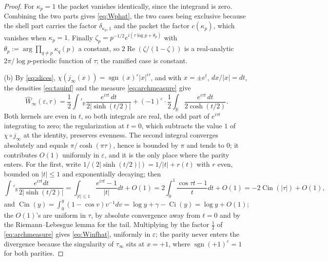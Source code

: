 \documentclass[11pt]{amsart}
\theoremstyle{definition}
\theoremstyle{remark}
\newcommand{\R}{\mathbb R}
\newcommand{\Rel}{\operatorname{Re}}
\newcommand{\sgn}{\operatorname{sgn}}
\newcommand{\Wh}{\widehat{W}}
\begin{document}
\begin{proof}
For $\kappa_p=1$ the packet vanishes identically, since the integrand is
zero.  Combining the two parts gives \eqref{eq:Wphat}, the two cases being exclusive because the shell
part carries the factor $\delta_{\kappa_p,1}$ and the packet the factor
$c(\kappa_p)$, which vanishes when $\kappa_p=1$.  Finally
$\zeta_p=p^{-1/2}e^{i(\tau\log p+\theta_p)}$ with
$\theta_p:=\arg\prod_{q\ne p}\kappa_q(p)$ a constant, so
$2\Rel(\zeta/(1-\zeta))$ is a real-analytic $2\pi/\log p$-periodic function of
$\tau$; the ramified case is constant.

(b)  By \eqref{eq:slices}, $\chi(j_{\infty}(x))=\sgn(x)^{\varepsilon}
|x|^{i\tau}$, and with $x=\pm e^{t}$, $dx/|x|=dt$, the densities
\eqref{eq:tauinf} and the measure \eqref{eq:archmeasure} give
\begin{equation}\label{eq:Winfhat2}
\Wh_{\infty}(\varepsilon,\tau)=\frac12\int'_{\R}
\frac{e^{i\tau t}\,dt}{2|\sinh(t/2)|}
+(-1)^{\varepsilon}\cdot\frac12\int_{\R}\frac{e^{i\tau t}\,dt}{2\cosh(t/2)} .
\end{equation}
Both kernels are even in $t$, so both integrals are real, the odd part of
$e^{i\tau t}$ integrating to zero; the regularization at $t=0$, which subtracts
the value $1$ of $\chi\circ j_{\infty}$ at the identity, preserves evenness.
The second integral converges absolutely and equals $\pi/\cosh(\pi\tau)$, hence
is bounded by $\pi$ and tends to $0$; it contributes $O(1)$ uniformly in
$\varepsilon$, and it is the only place where the parity enters.  For the first,
write $1/(2|\sinh(t/2)|)=1/|t|+r(t)$ with $r$ even, bounded on $|t|\le1$ and
exponentially decaying; then
\[
\int'_{\R}\frac{e^{i\tau t}dt}{2|\sinh(t/2)|}
=\int_{|t|\le1}\frac{e^{i\tau t}-1}{|t|}dt+O(1)
=2\int_0^{1}\frac{\cos\tau t-1}{t}dt+O(1)
=-2\operatorname{Cin}(|\tau|)+O(1),
\]
and $\operatorname{Cin}(y)=\int_0^{y}(1-\cos v)v^{-1}dv=\log y+\gamma-
\operatorname{Ci}(y)=\log y+O(1)$; the $O(1)$'s are uniform in $\tau$, by
absolute convergence away from $t=0$ and by the Riemann--Lebesgue lemma for the
tail.  Multiplying by the factor $\tfrac12$ of \eqref{eq:archmeasure} gives
\eqref{eq:Winfhat}, uniformly in $\varepsilon$; the parity never enters the
divergence because the singularity of $\tau_{\infty}$ sits at $x=+1$, where
$\sgn(+1)^{\varepsilon}=1$ for both parities.


\end{proof}
\end{document}
